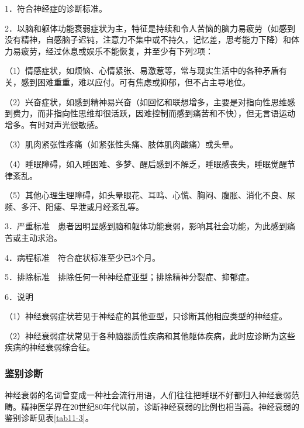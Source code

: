 1．符合神经症的诊断标准。

2．以脑和躯体功能衰弱症状为主，特征是持续和令人苦恼的脑力易疲劳（如感到没有精神，自感脑子迟钝，注意力不集中或不持久，记忆差，思考能力下降）和体力易疲劳，经过休息或娱乐不能恢复，并至少有下列2项：

（1）情感症状，如烦恼、心情紧张、易激惹等，常与现实生活中的各种矛盾有关，感到困难重重，难以应付。可有焦虑或抑郁，但不占主导地位。

（2）兴奋症状，如感到精神易兴奋（如回忆和联想增多，主要是对指向性思维感到费力，而非指向性思维却很活跃，因难控制而感到痛苦和不快），但无言语运动增多。有时对声光很敏感。

（3）肌肉紧张性疼痛（如紧张性头痛、肢体肌肉酸痛）或头晕。

（4）睡眠障碍，如入睡困难、多梦、醒后感到不解乏，睡眠感丧失，睡眠觉醒节律紊乱。

（5）其他心理生理障碍，如头晕眼花、耳鸣、心慌、胸闷、腹胀、消化不良、尿频、多汗、阳痿、早泄或月经紊乱等。

3．严重标准　患者因明显感到脑和躯体功能衰弱，影响其社会功能，为此感到痛苦或主动求治。

4．病程标准　符合症状标准至少已3个月。

5．排除标准　排除任何一种神经症亚型；排除精神分裂症、抑郁症。

6．说明

（1）神经衰弱症状若见于神经症的其他亚型，只诊断其他相应类型的神经症。

（2）神经衰弱症状常见于各种脑器质性疾病和其他躯体疾病，此时应诊断为这些疾病的神经衰弱综合征。

\subsubsection{鉴别诊断}

神经衰弱的名词曾变成一种社会流行用语，人们往往把睡眠不好都归入神经衰弱范畴。精神医学界在20世纪80年代以前，诊断神经衰弱的比例也相当高。神经衰弱的鉴别诊断见表\ref{tab11-3}。

